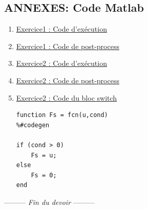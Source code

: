 \documentclass[a4paper,12pt,fleqn]{article}
\newcommand{\lastwords}{Fin du devoir}
\begin{document}
 \pagebreak[4]
\begin{center}
\section*{\textbf{ANNEXES: Code Matlab}}
\end{center}

\begin{enumerate}
\item \underline{Exercice1 : Code d'exécution}



\newpage
\item \underline{Exercice1 : Code de post-process}



\newpage
\item \underline{Exercice2 : Code d'exécution}



\newpage
\item \underline{Exercice2 : Code de post-process}



\newpage
\item \underline{Exercice2 : Code du bloc switch}

\begin{lstlisting}
function Fs = fcn(u,cond)
%#codegen

if (cond > 0)
    Fs = u;
else
    Fs = 0;
end
\end{lstlisting}
\end{enumerate}


\begin{center}
\vspace{3cm}
--------- \textit{\lastwords} ---------
\end{center}


\label{finalpage}
\end{document}
